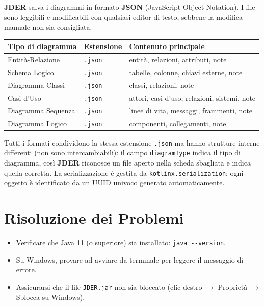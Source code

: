 \documentclass[a4paper,11pt]{article}
\newcommand{\jder}{\textbf{JDER}}
\begin{document}
\jder{} salva i diagrammi in formato \textbf{JSON} (JavaScript Object Notation). I file sono
leggibili e modificabili con qualsiasi editor di testo, sebbene la modifica manuale non sia
consigliata.

\begin{center}
\begin{tabular}{@{}lll@{}}
  \toprule
  \textbf{Tipo di diagramma} & \textbf{Estensione} & \textbf{Contenuto principale} \\
  \midrule
  Entità-Relazione    & \texttt{.json} & entità, relazioni, attributi, note \\
  Schema Logico       & \texttt{.json} & tabelle, colonne, chiavi esterne, note \\
  Diagramma Classi    & \texttt{.json} & classi, relazioni, note \\
  Casi d'Uso          & \texttt{.json} & attori, casi d'uso, relazioni, sistemi, note \\
  Diagramma Sequenza  & \texttt{.json} & linee di vita, messaggi, frammenti, note \\
  Diagramma Logico    & \texttt{.json} & componenti, collegamenti, note \\
  \bottomrule
\end{tabular}
\end{center}

Tutti i formati condividono la stessa estensione \texttt{.json} ma hanno strutture interne
differenti (non sono intercambiabili): il campo \texttt{diagramType} indica il tipo di diagramma,
così \jder{} riconosce un file aperto nella scheda sbagliata e indica quella corretta. La
serializzazione è gestita da \texttt{kotlinx.serialization}; ogni oggetto è identificato da un
UUID univoco generato automaticamente.

\section{Risoluzione dei Problemi}
\label{sec:troubleshooting}

\begin{tcolorbox}[warnbox, title={L'applicazione non si avvia}]
  \begin{itemize}
    \item Verificare che Java 11 (o superiore) sia installato: \texttt{java -{}-version}.
    \item Su Windows, provare ad avviare da terminale per leggere il messaggio di errore.
    \item Assicurarsi che il file \texttt{JDER.jar} non sia bloccato (clic destro
          $\to$ Proprietà $\to$ Sblocca su Windows).
  \end{itemize}
\end{tcolorbox}
\end{document}
